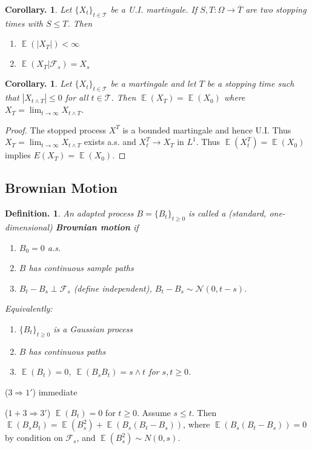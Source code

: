 \documentclass[11pt, a4paper]{memoir}
\newcommand{\imp}[2]{($#1\Rightarrow#2$)\hspace{0.2cm}}
\theoremstyle{change}
\newtheorem{corollary}[theorem]{Corollary.}
\theoremstyle{plain}
\theoremstyle{nonumberplain}
\newtheorem{definition}{Definition.}
\newtheorem{proof}{Proof}
\DeclareMathOperator{\E}{{\mathbb{E}}}
\newcommand{\defn}[1]{{\boldmath\bfseries #1}}
\numberwithin{equation}{section}
\begin{document}
\begin{corollary}
    Let $\{X_t\}_{t\in\mathcal{T}}$ be a U.I. martingale.
    If $S,T:\Omega\to\overline{T}$ are two stopping times with $S\leq T$.
    Then
    \begin{enumerate}[nl,r]
        \item $\E(|X_T|)<\infty$
        \item $\E(X_T|\mathcal{F}_s)=X_s$
    \end{enumerate}
\end{corollary}
\begin{corollary}
    Let $\{X_t\}_{t\in\mathcal{T}}$ be a martingale and let $T$ be a stopping time such that $|X_{t\wedge T}|\leq 0$ for all $t\in\mathcal{T}$.
    Then $\E(X_T)=\E(X_0)$ where $X_T=\lim_{t\to\infty}X_{t\wedge T}$.
\end{corollary}
\begin{proof}
    The stopped process $X^T$ is a bounded martingale and hence U.I.
    Thus $X_T=\lim_{t\to\infty}X_{t\wedge T}$ exists a.s. and $X_t^T\to X_T$ in $L^1$.
    Thus $\E(X^T_t)=\E(X_0)$ implies $E(X_T)=\E(X_0)$.
\end{proof}
\subsection{Brownian Motion}
\begin{definition}
    An adapted process $B=\{B_t\}_{t\geq 0}$ is called a (standard, one-dimensional) \defn{Brownian motion} if
    \begin{enumerate}[nl]
        \item $B_0=0$ a.s.
        \item $B$ has continuous sample paths
        \item $B_t-B_s\perp\mathcal{F}_s$ (define independent), $B_t-B_s\sim \mathcal{N}(0,t-s)$.
    \end{enumerate}
    Equivalently:
    \begin{enumerate}[nl]
        \item[1'] $\{B_t\}_{t\geq 0}$ is a Gaussian process
        \item[2'] $B$ has continuous paths
        \item[3'] $\E(B_t)=0$, $\E(B_sB_t)=s\wedge t$ for $s,t\geq 0$.
    \end{enumerate}
\end{definition}
\imp{3}{1'}
immediate

\imp{1+3}{3'}
$\E(B_t)=0$ for $t\geq 0$.
Assume $s\leq t$.
Then $\E(B_sB_t)=\E(B_s^2)+\E(B_s(B_t-B_s))$, where $\E(B_s(B_t-B_s))=0$ by condition on $\mathcal{F}_s$, and $\E(B_s^2)\sim N(0,s)$.
\end{document}

